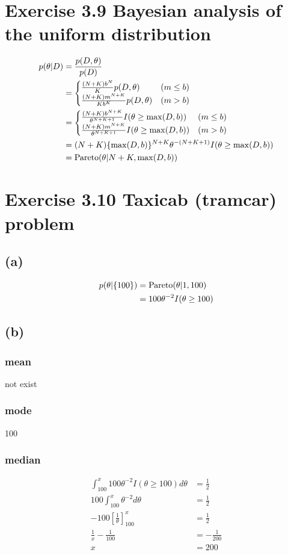 \documentclass{jsarticle}
\begin{document}
\section*{Exercise 3.9 Bayesian analysis of the uniform distribution}
\begin{align}
p(\theta|D) & = \frac{p(D,\theta)}{p(D)}\\
& = \begin{cases}
\frac{(N+K)b^N}{K}p(D,\theta) & (m \leq b) \\
\frac{(N+K)m^{N+K}}{Kb^K}p(D, \theta) & (m > b)
\end{cases} \\
& = \begin{cases}
\frac{(N+K)b^{N+K}}{\theta^{N+K+1}}I(\theta \geq \max(D,b)) & (m \leq b)\\
\frac{(N+K)m^{N+K}}{\theta^{N+K+1}}I(\theta \geq \max(D,b)) & (m > b)
\end{cases}\\
& = (N+K)\{\max(D,b) \}^{N+K}\theta^{-(N+K+1)}I(\theta \geq \max (D,b)) \\
& = {\rm Pareto}(\theta|N+K,\max(D,b))
\end{align}

\section*{Exercise 3.10 Taxicab (tramcar) problem}
\subsection*{(a)}
\begin{align}
p(\theta|\{100\}) & = {\rm Pareto}(\theta|1,100)\\
& = 100 \theta^{-2}I(\theta \geq 100)
\end{align}
\subsection*{(b)}
\subsubsection*{mean}
not exist
\subsubsection*{mode}
100
\subsubsection*{median}
\begin{align}
\int_{100}^{x}100\theta^{-2}I(\theta \geq 100)d\theta & = \frac{1}{2}\\
100\int_{100}^{x}\theta^{-2}d\theta & = \frac{1}{2}\\
-100[\frac{1}{\theta}]_{100}^{x} & = \frac{1}{2}\\
\frac{1}{x} - \frac{1}{100} & = - \frac{1}{200}\\
x & = 200
\end{align}
\end{document}
